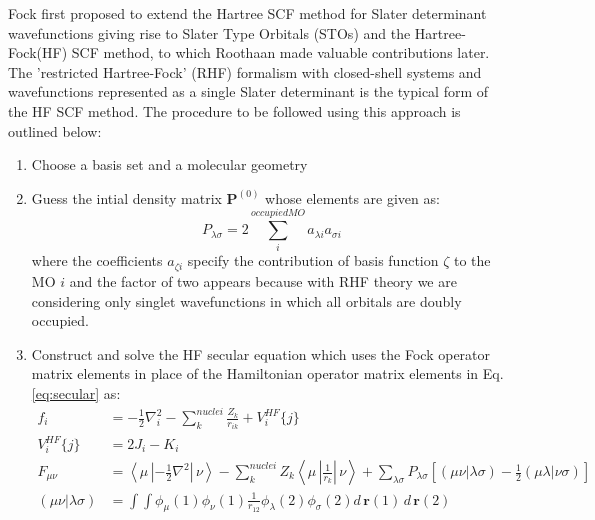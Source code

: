             Fock first proposed to extend the Hartree SCF method for Slater determinant wavefunctions giving rise to Slater Type Orbitals (STOs) and the Hartree-Fock(HF) SCF method$\allowbreak$, to which Roothaan \cite{Roothaan1951} made valuable contributions later. The 'restricted Hartree-Fock' (RHF) formalism with closed-shell systems and wavefunctions represented as a single Slater determinant is the typical form of the HF SCF method. The procedure to be followed using this approach is outlined below:
            \begin{enumerate}
                \item Choose a basis set and a molecular geometry
                \item Guess the intial density matrix $\mathbf{P}^{(0)}$ whose elements are given as:
                    \begin{equation}\label{eq:density matrix elements}
                        P_{\lambda \sigma} = 2 \displaystyle\sum_i^{occupied MO} a_{\lambda i} a_{\sigma i}
                    \end{equation}
                    where the coefficients $a_{\zeta i}$ specify the contribution of basis function $\zeta$ to the MO $i$ and the factor of two appears because with RHF theory we are considering only singlet wavefunctions in which all orbitals are doubly occupied.
                \item Construct and solve the HF secular equation which uses the Fock operator matrix elements in place of the Hamiltonian operator matrix elements in Eq. \eqref{eq:secular} as:
                    \begin{equation}\label{eq:one electron Fock matrix elements}
                        \begin{aligned}
                            f_i &= -\frac{1}{2} \nabla^2_i - \displaystyle\sum_k^{nuclei} \frac{Z_k}{r_{ik}} + V_i^{HF} \{j\}\\
                            V_i^{HF} \{j\} &= 2 J_i - K_i\\
                            F_{\mu \nu} &= \left< \mu \,\left| -\frac{1}{2} \nabla^2 \right|\,\nu \right> - \displaystyle\sum_k^{nuclei} Z_k \left< \mu \,\left| \frac{1}{r_k} \right| \, \nu \right> + \displaystyle\sum_{\lambda \sigma} P_{\lambda \sigma} \left[ (\mu \nu | \lambda \sigma) - \frac{1}{2} (\mu \lambda | \nu \sigma) \right]\\
                            (\mu \nu | \lambda \sigma) &= \displaystyle\int \int \phi_\mu (1) \phi_\nu(1) \frac{1}{r_{12}}\phi_\lambda (2) \phi_\sigma (2) d\,\mathbf{r}(1)\,d\,\mathbf{r}(2)

\end{aligned}
\end{equation}
\end{enumerate}
